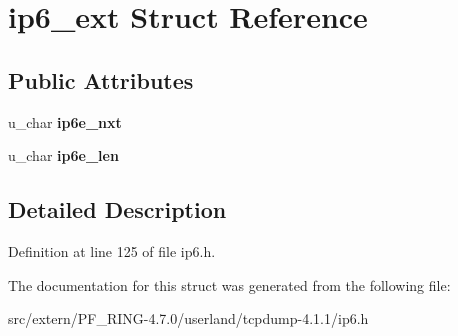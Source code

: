 \hypertarget{structip6__ext}{
\section{ip6\_\-ext Struct Reference}
\label{structip6__ext}
}
\subsection*{Public Attributes}
\begin{DoxyCompactItemize}
\item 
\hypertarget{structip6__ext_a6997afcb1be009fa4529ed96f2771c3e}{
u\_\-char {\bfseries ip6e\_\-nxt}}
\label{structip6__ext_a6997afcb1be009fa4529ed96f2771c3e}

\item 
\hypertarget{structip6__ext_a93ad74e3149a0ddf6e6b914f89a4bc25}{
u\_\-char {\bfseries ip6e\_\-len}}
\label{structip6__ext_a93ad74e3149a0ddf6e6b914f89a4bc25}

\end{DoxyCompactItemize}


\subsection{Detailed Description}


Definition at line 125 of file ip6.h.



The documentation for this struct was generated from the following file:\begin{DoxyCompactItemize}
\item 
src/extern/PF\_\-RING-\/4.7.0/userland/tcpdump-\/4.1.1/ip6.h\end{DoxyCompactItemize}
